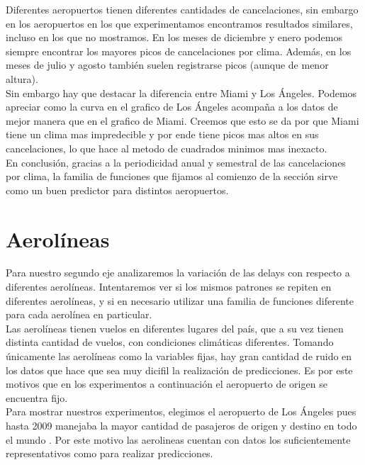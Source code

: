 Diferentes aeropuertos tienen diferentes cantidades de cancelaciones, sin embargo en los aeropuertos en los que experimentamos encontramos resultados similares, incluso en los que no mostramos. En los meses de diciembre y enero podemos siempre encontrar los mayores picos de cancelaciones por clima. Además, en los meses de julio y agosto también suelen registrarse picos (aunque de menor altura). \\

Sin embargo hay que destacar la diferencia entre Miami y Los Ángeles. Podemos apreciar como la curva en el grafico de Los Ángeles acompaña a los datos de mejor manera que en el grafico de Miami. Creemos que esto se da por que Miami tiene un clima mas impredecible y por ende tiene picos mas altos en sus cancelaciones, lo que hace al metodo de cuadrados minimos mas inexacto.\\

En conclusión, gracias a la periodicidad anual y semestral de las cancelaciones por clima, la familia de funciones que fijamos al comienzo de la sección sirve como un buen predictor para distintos aeropuertos. \\

\section{Aerolíneas}

Para nuestro segundo eje analizaremos la variación de las delays con respecto a diferentes aerolíneas. Intentaremos ver si los mismos patrones se repiten en diferentes aerolíneas, y si en necesario utilizar una familia de funciones diferente para cada aerolínea en particular. \\

Las aerolíneas tienen vuelos en diferentes lugares del país, que a su vez tienen distinta cantidad de vuelos, con condiciones climáticas diferentes. Tomando únicamente las aerolíneas como la variables fijas, hay gran cantidad de ruido en los datos que hace que sea muy dicifil la realización de predicciones. Es por este motivos que en los experimentos a continuación el aeropuerto de origen se encuentra fijo. \\

Para mostrar nuestros experimentos, elegimos el aeropuerto de Los Ángeles pues hasta 2009 manejaba la mayor cantidad de pasajeros de origen y destino en todo el mundo \cite{LosAngelesAeropuerto}. Por este motivo las aerolineas cuentan con datos los suficientemente representativos como para realizar predicciones. \\

